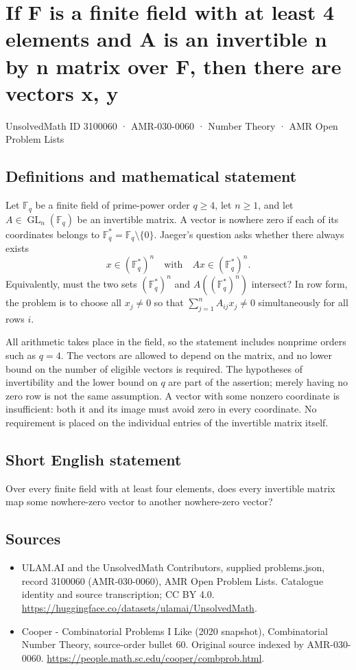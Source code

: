 \documentclass[11pt,a4paper]{article}
\begin{document}
\section*{If F is a finite field with at least 4 elements and A is an invertible n by n matrix over F, then there are vectors x, y}\label{3100060}
{\small UnsolvedMath ID 3100060 · AMR-030-0060 · Number Theory · AMR Open Problem Lists}
\subsection{Definitions and mathematical statement}
Let $\mathbb F_q$ be a finite field of prime-power order $q\ge4$,
let $n\ge1$, and let $A\in\operatorname{GL}_n(\mathbb F_q)$ be
an invertible matrix. A vector is nowhere zero if each of its
coordinates belongs to $\mathbb F_q^*=\mathbb F_q\setminus\{0\}$.
Jaeger's question asks whether there always exists
\[
              x\in(\mathbb F_q^*)^n
                     \quad\text{with}\quad
              Ax\in(\mathbb F_q^*)^n.
\]
Equivalently, must the two sets
$(\mathbb F_q^*)^n$ and $A((\mathbb F_q^*)^n)$ intersect?
In row form, the problem is to choose all $x_j\ne0$ so that
$\sum_{j=1}^n A_{ij}x_j\ne0$ simultaneously for all rows $i$.

All arithmetic takes place in the field, so the statement includes
nonprime orders such as $q=4$. The vectors are allowed to depend
on the matrix, and no lower bound on the number of eligible
vectors is required. The hypotheses of invertibility and the
lower bound on $q$ are part of the assertion; merely having no
zero row is not the same assumption. A vector with some nonzero
coordinate is insufficient: both it and its image must avoid
zero in every coordinate. No requirement is placed on the
individual entries of the invertible matrix itself.
\subsection{Short English statement}
Over every finite field with at least four elements, does every invertible matrix map some nowhere-zero vector to another nowhere-zero vector?
\subsection{Sources}
\begin{itemize}
\item[S1] ULAM.AI and the UnsolvedMath Contributors, supplied problems.json, record 3100060 (AMR-030-0060), AMR Open Problem Lists. Catalogue identity and source transcription; CC BY 4.0.
\url{https://huggingface.co/datasets/ulamai/UnsolvedMath}.
\item[S2] Cooper - Combinatorial Problems I Like (2020 snapshot), Combinatorial Number Theory, source-order bullet 60. Original source indexed by AMR-030-0060.
\url{https://people.math.sc.edu/cooper/combprob.html}.
\end{itemize}
\end{document}
